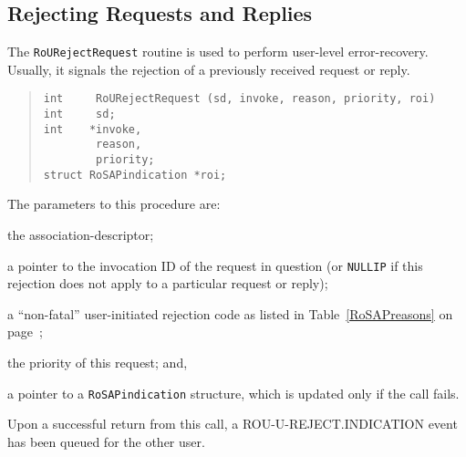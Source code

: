 \subsection     {Rejecting Requests and Replies}
The \verb"RoURejectRequest" routine is used to perform user-level
error-recovery.
Usually,
it signals the rejection of a previously received request or reply.
\begin{quote}\small\begin{verbatim}
int     RoURejectRequest (sd, invoke, reason, priority, roi)
int     sd;
int    *invoke,
        reason,
        priority;
struct RoSAPindication *roi;
\end{verbatim}\end{quote}
The parameters to this procedure are:
\begin{describe}
\item[\verb"sd":] the association-descriptor;

\item[\verb"invoke":] a pointer to the invocation ID of the request in
question (or \verb"NULLIP" if this rejection does not apply to a particular
request or reply);

\item[\verb"reason":] a ``non-fatal'' user-initiated rejection code as
listed in Table~\ref{RoSAPreasons} on page~\pageref{RoSAPreasons};

\item[\verb"priority":] the priority of this request;
and,

\item[\verb"roi":] a pointer to a \verb"RoSAPindication" structure, which is
updated only if the call fails.
\end{describe}
Upon a successful return from this call,
a {\sf ROU-U-REJECT.INDICATION\/} event has been queued for the other user.

